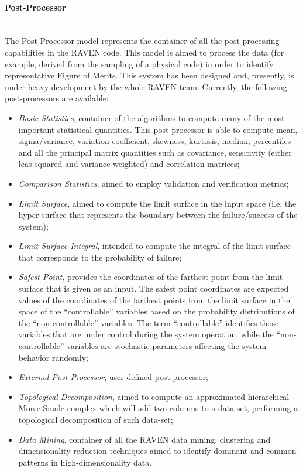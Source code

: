 \paragraph{Post-Processor} ~\\
The Post-Processor model represents the container of all the post-processing capabilities in the RAVEN code. This model is aimed to process the data (for example, derived from the sampling of a physical code) in order to identify representative Figure of Merits. This system has  been designed and, presently, is under heavy development by the whole RAVEN team.  Currently, the following post-processors are available:
\begin{itemize}
 \item \textit{Basic Statistics}, container of the algorithms to compute many of the most important statistical quantities. This post-processor is able to compute mean, sigma/variance, variation coefficient, skewness, kurtosis, median, percentiles and all the principal matrix quantities such as covariance, sensitivity (either leas-squared and variance weighted) and correlation matrices;
 \item \textit{Comparison Statistics}, aimed to employ validation and verification metrics;
 \item \textit{Limit Surface}, aimed to compute the limit surface in the input space (i.e. the hyper-surface that represents the boundary between the failure/success of the system);
 \item \textit{Limit Surface Integral}, intended to compute the integral of the limit surface that corresponds to the probability of failure;
  \item \textit{Safest Point}, provides the coordinates of the farthest point from the limit surface that is given as an input. The safest point coordinates are expected values of the coordinates of the farthest points from the limit surface in the space of the ``controllable'' variables based on the probability distributions of the ``non-controllable'' variables. The term ``controllable'' identifies those variables that are under control during the system operation, while the ``non-controllable'' variables are stochastic parameters affecting the system behavior randomly;
 \item \textit{External Post-Processor}, user-defined post-processor;
 \item \textit{Topological Decomposition}, aimed to compute an approximated hierarchical Morse-Smale complex which will add two columns to a data-set, performing a topological decomposition of such data-set;
 \item \textit{Data Mining}, container of all the RAVEN data mining, clustering and dimensionality reduction techniques aimed to identify dominant and common patterns in high-dimensionality data.
\end{itemize}
